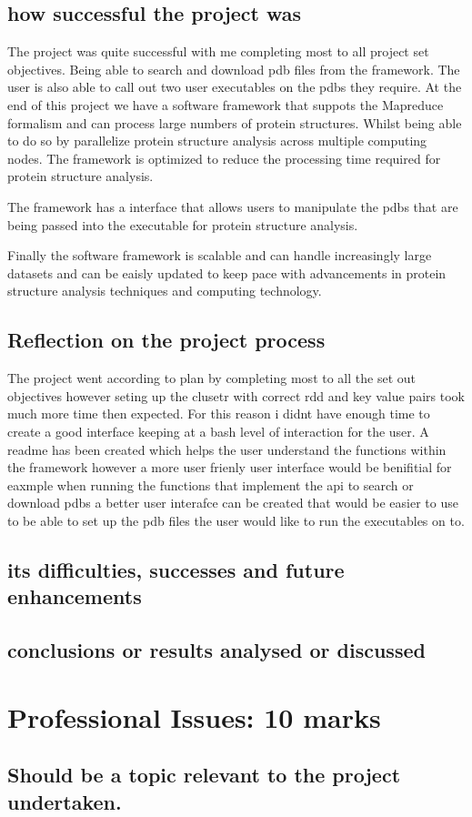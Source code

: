 \documentclass[]{final_report}
\begin{document}
\subsection{how successful the project was}

The project was quite successful with me completing most to all project set objectives. Being able to search and download pdb files from the framework. The user is also able to call out two user executables on the pdbs they require. At the end of this project we have a software framework that suppots the Mapreduce formalism and can process large numbers of protein structures. Whilst being able to do so by parallelize protein structure analysis across multiple computing nodes. The framework is optimized to reduce the processing time required for protein structure analysis.

The framework has a interface that allows users to manipulate the pdbs that are being passed into the executable for protein structure analysis.

Finally the software framework is scalable and can handle increasingly large datasets and can be eaisly updated to keep pace with advancements in protein structure analysis techniques and computing technology.

\subsection{Reflection on the project process}

The project went according to plan by completing most to all the set out objectives however seting up the clusetr with correct rdd and key value pairs took much more time then expected. For this reason i didnt have enough time to create a good interface keeping at a bash level of interaction for the user. A readme has been created which helps the user understand the functions within the framework however a more user frienly user interface would be benifitial for eaxmple when running the functions that implement the api to search or download pdbs a better user interafce can be created that would be easier to use to be able to set up the pdb files the user would like to run the executables on to.

\subsection{its difficulties, successes and future enhancements}
\subsection{conclusions or results analysed or discussed}

\section{Professional Issues: 10 marks}
\subsection{Should be a topic relevant to the project undertaken.}



\end{document}
